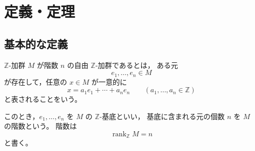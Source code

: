 
\section{定義・定理}

\subsection{基本的な定義}

\begin{definition}
	$\mathbb{Z}$-加群 $M$ が階数 $n$ の自由 $\mathbb{Z}$-加群であるとは，
	ある元
	\[
	e_1,\dots,e_n\in M
	\]
	が存在して，任意の $x\in M$ が一意的に
	\[
	x=a_1e_1+\cdots+a_ne_n
	\qquad
	(a_1,\dots,a_n\in\mathbb{Z})
	\]
	と表されることをいう。
	
	このとき，$e_1,\dots,e_n$ を $M$ の $\mathbb{Z}$-基底といい，
	基底に含まれる元の個数 $n$ を $M$ の階数という。
	階数は
	\[
	\operatorname{rank}_{\mathbb{Z}} M=n
	\]
	と書く。
\end{definition}